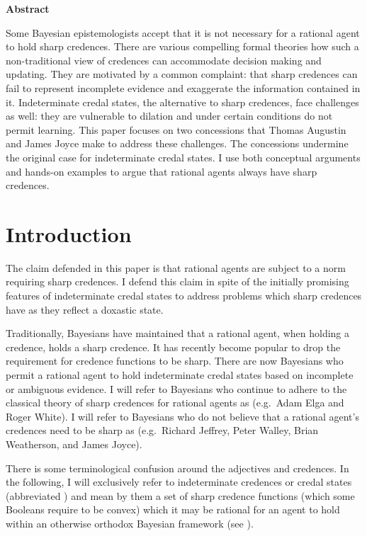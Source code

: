 \documentclass[12pt]{article}
\begin{document}
\raggedright
\doublespacing

\textbf{Abstract}

Some Bayesian epistemologists accept that it is not necessary for
a rational agent to hold sharp credences. There are various
compelling formal theories how such a non-traditional view of
credences can accommodate decision making and updating. They are
motivated by a common complaint: that sharp credences can fail to
represent incomplete evidence and exaggerate the information
contained in it. Indeterminate credal states, the alternative to
sharp credences, face challenges as well: they are vulnerable to
dilation and under certain conditions do not permit learning. This
paper focuses on two concessions that Thomas Augustin and James
Joyce make to address these challenges. The concessions undermine
the original case for indeterminate credal states. I use both
conceptual arguments and hands-on examples to argue that rational
agents always have sharp credences.

\newpage

\section{Introduction}
\label{Introduction}

The claim defended in this paper is that rational agents are subject
to a norm requiring sharp credences. I defend this claim in spite of
the initially promising features of indeterminate credal states to
address problems which sharp credences have as they reflect a doxastic
state.

Traditionally, Bayesians have maintained that a rational agent, when
holding a credence, holds a sharp credence. It has recently become
popular to drop the requirement for credence functions to be sharp.
There are now Bayesians who permit a rational agent to hold
indeterminate credal states based on incomplete or ambiguous evidence.
I will refer to Bayesians who continue to adhere to the classical
theory of sharp credences for rational agents as 
(e.g.\ Adam Elga and Roger White). I will refer to Bayesians who do
not believe that a rational agent's credences need to be sharp as
 (e.g.\ Richard Jeffrey, Peter Walley, Brian
Weatherson, and James Joyce).

There is some terminological confusion around the adjectives
  and  credences.
In the following, I will exclusively refer to indeterminate credences
or credal states (abbreviated ) and mean by them a set
of sharp credence functions (which some Booleans require to be convex)
which it may be rational for an agent to hold within an otherwise
orthodox Bayesian framework (see ). 
\end{document}
